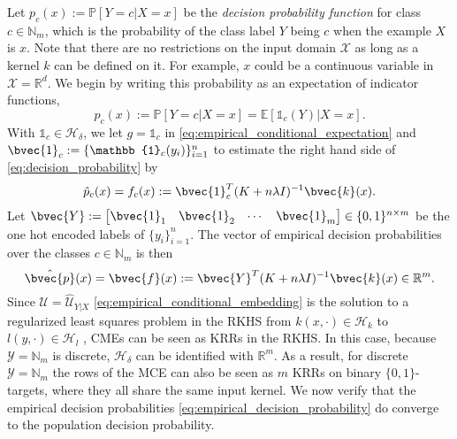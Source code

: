 \documentclass[twoside]{article}
\begin{document}
		Let $p_{c}(x) := \mathbb{P}[Y = c | X = x]$ be the \textit{decision probability function} for class $c \in \mathbb{N}_{m}$, which is the probability of the class label $Y$ being $c$ when the example $X$ is $x$. Note that there are no restrictions on the input domain $\mathcal{X}$ as long as a kernel $k$ can be defined on it. For example, $x$ could be a continuous variable in $\mathcal{X} = \mathbb{R}^{d}$. We begin by writing this probability as an expectation of indicator functions,
		\begin{equation}
		p_{c}(x) := \mathbb{P}[Y = c | X = x] = \mathbb{E}[\mathbb{1}_{c}(Y) | X = x].
		\label{eq:decision_probability}
		\end{equation}	
		With $\mathbb{1}_{c} \in \mathcal{H}_{\delta}$, we let $g = \mathbb{1}_{c}$ in \eqref{eq:empirical_conditional_expectation} and $\bvec{1}_{c} := \{\mathbb{1}_{c}(y_{i})\}_{i = 1}^{n}$ to estimate the right hand side of \eqref{eq:decision_probability} by
		\begin{equation}
		\hat{p}_{c}(x) = f_{c}(x) := \bvec{1}_{c}^{T} (K + n \lambda I)^{-1} \bvec{k}(x).
		\label{eq:empirical_decision_probability}
		\end{equation}
		Let $\bvec{Y} := \begin{bmatrix} \bvec{1}_{1} & \bvec{1}_{2} & \cdots & \bvec{1}_{m} \end{bmatrix} \in \{0, 1\}^{n \times m}$ be the one hot encoded labels of $\{y_{i}\}_{i = 1}^{n}$. The vector of empirical decision probabilities over the classes $c \in \mathbb{N}_{m}$ is then
		\begin{equation}
		\hat{\bvec{p}}(x) = \bvec{f}(x) := \bvec{Y}^{T} (K + n \lambda I)^{-1} \bvec{k}(x) \in \mathbb{R}^{m}.
		\label{eq:empirical_decision_probability_vector}
		\end{equation}
		Since $\mathcal{U} = \hat{\mathcal{U}}_{Y | X}$ \eqref{eq:empirical_conditional_embedding} is the solution to a regularized least squares problem in the RKHS from $k(x, \cdot) \in \mathcal{H}_{k}$ to $l(y, \cdot) \in \mathcal{H}_{l}$ \citep{lever2012conditional}, \glspl{CME} can be seen as \glspl{KRR} in the \gls{RKHS}. In this case, because $\mathcal{Y} = \mathbb{N}_{m}$ is discrete, $\mathcal{H}_{\delta}$ can be identified with $\mathbb{R}^{m}$. As a result, for discrete $\mathcal{Y} = \mathbb{N}_{m}$ the rows of the \gls{MCE} can also be seen as $m$ \glspl{KRR} \citep{friedman2001elements} on binary $\{0, 1\}$-targets, where they all share the same input kernel. We now verify that the empirical decision probabilities \eqref{eq:empirical_decision_probability} do converge to the population decision probability.
\end{document}
